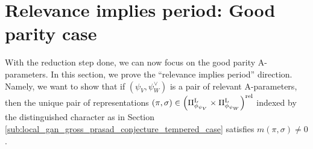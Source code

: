 \documentclass[11pt,letterpaper]{amsart}
\theoremstyle{plain}
\newcounter{theorem}[section]
\numberwithin{theorem}{section}
\numberwithin{equation}{subsection}
\theoremstyle{remark}
\newtheorem{Def}[theorem]{Definition}
\newcommand{\SL}{\operatorname{SL}}
\newcommand{\C}{\mathbb{C}}
\def\LP{\Pi^{\rm L}} %
\def\rel{{\rm rel}} %
\begin{document}
\section{Relevance implies period: Good parity case}\label{sec:relevance_implies_period}

With the reduction step done, we can now focus on the good parity A-parameters. In this section, we prove the ``relevance implies period'' direction. Namely, we want to show that if \(\left(\psi_V,\psi_W^{\vee}\right)\) is a pair of relevant A-parameters, then the unique pair of representations \(\left(\pi,\sigma\right)\in\left(\LP_{\phi_{\psi_V}}\times\LP_{\phi_{\psi_W}}\right)^{\rel}\) indexed by the distinguished character as in Section \ref{sub:local_gan_gross_prasad_conjecture_tempered_case} satisfies \(m\left(\pi,\sigma\right)\neq 0\).


%
\end{document}
